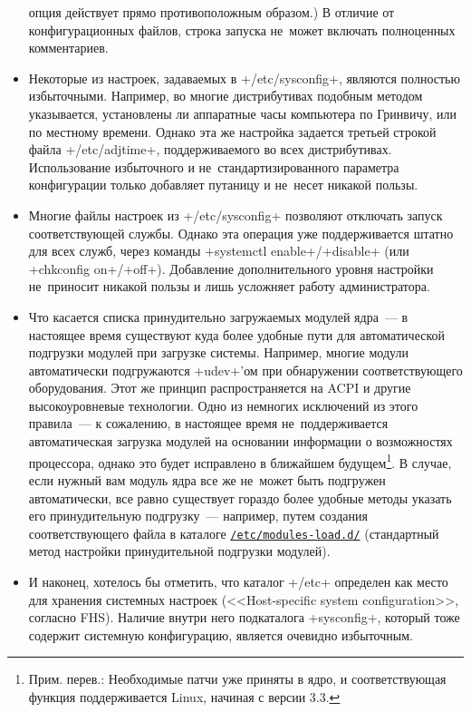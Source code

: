 \documentclass[10pt,oneside,a4paper]{article}
\newcommand{\hreftt}[2]{\href{#1}{\texttt{#2}}}
\begin{document}
\begin{itemize}
		опция действует прямо противоположным образом.) В отличие от
		конфигурационных файлов, строка запуска не~может включать
		полноценных комментариев.
	\item Некоторые из настроек, задаваемых в +/etc/sysconfig+, являются
		полностью избыточными. Например, во многие дистрибутивах
		подобным методом указывается, установлены ли аппаратные часы
		компьютера по Гринвичу, или по местному времени. Однако эта же
		настройка задается третьей строкой файла +/etc/adjtime+,
		поддерживаемого во всех дистрибутивах. Использование
		избыточного и не~стандартизированного параметра конфигурации
		только добавляет путаницу и не~несет никакой пользы.
	\item Многие файлы настроек из +/etc/sysconfig+ позволяют отключать
		запуск соответствующей службы. Однако эта операция уже
		поддерживается штатно для всех служб, через команды
		+systemctl enable+/+disable+ (или +chkconfig on+/+off+).
		Добавление дополнительного уровня настройки не~приносит никакой
		пользы и лишь усложняет работу администратора.
	\item Что касается списка принудительно загружаемых модулей ядра~--- в
		настоящее время существуют куда более удобные пути для
		автоматической подгрузки модулей при загрузке системы. Например,
		многие модули автоматически подгружаются +udev+'ом при
		обнаружении соответствующего оборудования. Этот же принцип
		распространяется на ACPI и другие высокоуровневые технологии.
		Одно из немногих исключений из этого правила~--- к сожалению, в
		настоящее время не~поддерживается автоматическая загрузка
		модулей на основании информации о возможностях процессора,
		однако это будет исправлено в ближайшем будущем\footnote{Прим.
		перев.: Необходимые патчи уже приняты в ядро, и
		соответствующая функция поддерживается Linux, начиная с версии
		3.3.}. В случае, если нужный вам модуль ядра все же не~может
		быть подгружен автоматически, все равно существует гораздо более
		удобные методы указать его принудительную подгрузку~---
		например, путем создания соответствующего файла в каталоге
		\hreftt{http://0pointer.de/public/systemd-man/modules-load.d.html}{/etc/modules-load.d/}
		(стандартный метод настройки принудительной подгрузки модулей).
	\item И наконец, хотелось бы отметить, что каталог +/etc+ определен как
		место для хранения системных настроек (<<Host-specific system
		configuration>>, согласно FHS). Наличие внутри него подкаталога
		+sysconfig+, который тоже содержит системную конфигурацию,
		является очевидно избыточным.
\end{itemize}
\end{document}
